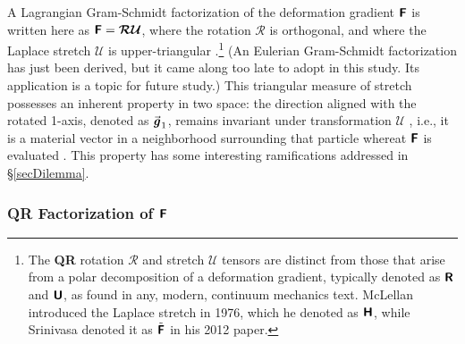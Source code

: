 A Lagrangian Gram-Schmidt factorization of the deformation gradient $\boldsymbol{\mathsf{F}}$ is written here as $\boldsymbol{\mathsf{F}} = \boldsymbol{\mathcal{RU}}$, where the rotation $\boldsymbol{\mathcal{R}}$ is orthogonal, and where the Laplace stretch $\boldsymbol{\mathcal{U}}$ is upper-triangular \cite{Freedetal19}.\footnote{
	The \textbf{QR} rotation $\boldsymbol{\mathcal{R}}$ and stretch $\boldsymbol{\mathcal{U}}$ tensors are distinct from those that arise from a polar decomposition of a deformation gradient, typically denoted as $\boldsymbol{\mathsf{R}}$ and $\boldsymbol{\mathsf{U}}$, as found in any, modern, continuum mechanics text.  McLellan \cite{McLellan76,McLellan80} introduced the Laplace stretch in 1976, which he denoted as $\boldsymbol{\mathsf{H}}$, while Srinivasa \cite{Srinivasa12} denoted it as $\tilde{\boldsymbol{\mathsf{F}}}$ in his 2012 paper.
} 
(An Eulerian Gram-Schmidt factorization has just been derived, \cite{Freedetal20} but it came along too late to adopt in this study.  Its application is a topic for future study.)  This triangular measure of stretch possesses an inherent property in two space: the direction aligned with the rotated 1-axis, denoted as $\vec{\boldsymbol{\mathit{g}}}_{\hspace{0.5pt}1}$, remains invariant under transformation $\boldsymbol{\mathcal{U}}$ \cite{McLellan80}, i.e., it is a material vector in a neighborhood surrounding that particle whereat $\boldsymbol{\mathsf{F}}$ is evaluated \cite{FreedZamani18}.  This property has some interesting ramifications addressed in \S\ref{secDilemma}.

\subsubsection{\textbf{QR} Factorization of\/ $\boldsymbol{\mathsf{F}}$}
\label{secQR2D}

